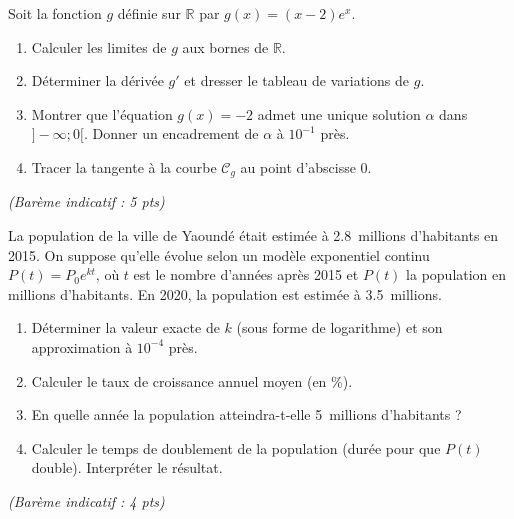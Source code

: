 \documentclass[11pt]{article}
\begin{document}
\begin{exercice}
Soit la fonction $g$ définie sur $\mathbb{R}$ par $g(x) = (x - 2)e^{x}$.
\begin{enumerate}
    \item Calculer les limites de $g$ aux bornes de $\mathbb{R}$.
    \item Déterminer la dérivée $g'$ et dresser le tableau de variations de $g$.
    \item Montrer que l'équation $g(x) = -2$ admet une unique solution $\alpha$ dans $]-\infty; 0[$. Donner un encadrement de $\alpha$ à $10^{-1}$ près.
    \item Tracer la tangente à la courbe $\mathcal{C}_g$ au point d'abscisse $0$.
\end{enumerate}
\hfill \textit{(Barème indicatif : 5 pts)}
\end{exercice}

\begin{exercice}
La population de la ville de Yaoundé était estimée à \SI{2,8}{millions} d'habitants en 2015. On suppose qu'elle évolue selon un modèle exponentiel continu $P(t) = P_0 e^{kt}$, où $t$ est le nombre d'années après 2015 et $P(t)$ la population en millions d'habitants. En 2020, la population est estimée à \SI{3,5}{millions}.
\begin{enumerate}
    \item Déterminer la valeur exacte de $k$ (sous forme de logarithme) et son approximation à $10^{-4}$ près.
    \item Calculer le taux de croissance annuel moyen (en \%). 
    \item En quelle année la population atteindra-t-elle \SI{5}{millions} d'habitants ?
    \item Calculer le temps de doublement de la population (durée pour que $P(t)$ double). Interpréter le résultat.
\end{enumerate}
\hfill \textit{(Barème indicatif : 4 pts)}
\end{exercice}
\end{document}
